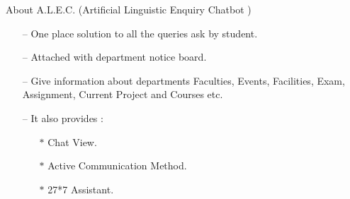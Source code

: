 \documentclass{beamer}
\begin{document}
\begin{frame}{About A.L.E.C. (Artificial Linguistic Enquiry Chatbot )}

\begin{itemize}
    \item[--] One place solution to all the queries ask by student.
    \linebreak
    \item[--] Attached with department notice board.
    \linebreak
    \item[--] Give information about departments Faculties, Events, Facilities, Exam, Assignment, Current Project and Courses etc.
    \linebreak
    \item[--] It also provides :
      \begin{itemize}
          \item[$\ast$]  Chat View.
          \item[$\ast$]  Active Communication Method.
          \item[$\ast$]  27*7 Assistant.
      \end{itemize}
\end{itemize}
    
\end{frame}
\end{document}

